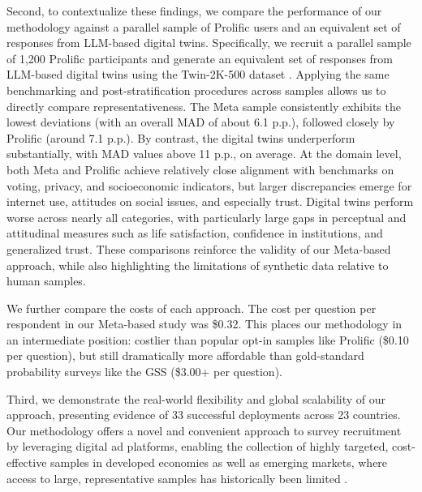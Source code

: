 \documentclass[letterpaper,12pt]{article}
\theoremstyle{proposition}
\begin{document}
Second, to contextualize these findings, we compare the performance of our methodology  against a parallel sample of Prolific users and an equivalent set of responses from LLM-based digital twins. Specifically, we recruit a parallel sample of 1,200 Prolific participants and generate an equivalent set of responses from LLM-based digital twins using the Twin-2K-500 dataset \citep{toubia2025twin}. Applying the same benchmarking and post-stratification procedures across samples allows us to directly compare representativeness. The Meta sample consistently exhibits the lowest deviations (with an overall MAD of about 6.1 p.p.), followed closely by Prolific (around 7.1 p.p.). By contrast, the digital twins underperform substantially, with MAD values above 11 p.p., on average. At the domain level, both Meta and Prolific achieve relatively close alignment with benchmarks on voting, privacy, and socioeconomic indicators, but larger discrepancies emerge for internet use, attitudes on social issues, and especially trust. Digital twins perform worse across nearly all categories, with particularly large gaps in perceptual and attitudinal measures such as life satisfaction, confidence in institutions, and generalized trust. These comparisons reinforce the validity of our Meta-based approach, while also highlighting the limitations of synthetic data relative to human samples.

We further compare the costs of each approach. The cost per question per respondent in our Meta-based study was \$0.32. This places our methodology in an intermediate position: costlier than popular opt-in samples like Prolific (\$0.10 per question), but still dramatically more affordable than gold-standard probability surveys like the GSS (\$3.00+ per question).

Third, we demonstrate the real-world flexibility and global scalability of our approach, presenting evidence of 33 successful deployments across 23 countries. Our methodology offers a novel and convenient approach to survey recruitment by leveraging digital ad platforms, enabling the collection of highly targeted, cost-effective samples in developed economies as well as emerging markets, where access to large, representative samples has historically been limited \citep{narasimhan2015marketing}. 
\end{document}
